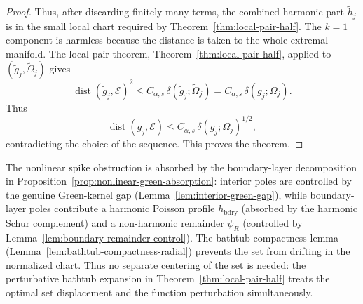 \begin{proof}
Thus, after discarding finitely many terms, the combined harmonic part
$\widetilde h_j$ is in the small local chart required by
Theorem~\ref{thm:local-pair-half}.  The $k=1$ component is harmless because
the distance is taken to the whole extremal manifold.  The local pair theorem,
Theorem~\ref{thm:local-pair-half}, applied to
$(\widetilde g_j,\widetilde\Omega_j)$ gives
\[
\operatorname{dist}(\widetilde g_j,\mathcal E)^2
\le
C_{\alpha,s}\,\delta(\widetilde g_j;\widetilde\Omega_j)
=
C_{\alpha,s}\,\delta(g_j;\Omega_j).
\]
Thus
\[
\operatorname{dist}(g_j,\mathcal E)
\le
C_{\alpha,s}\,\delta(g_j;\Omega_j)^{1/2},
\]
contradicting the choice of the sequence. This proves the theorem.
\end{proof}

\begin{numrem}
The nonlinear spike obstruction is absorbed by the boundary-layer
decomposition in Proposition~\ref{prop:nonlinear-green-absorption}:
interior poles are controlled by the genuine Green-kernel gap
(Lemma~\ref{lem:interior-green-gap}), while boundary-layer poles contribute
a harmonic Poisson profile $h_{\mathrm{bdry}}$ (absorbed by the harmonic
Schur complement) and a non-harmonic remainder $\psi_R$ (controlled by
Lemma~\ref{lem:boundary-remainder-control}).  The bathtub compactness lemma
(Lemma~\ref{lem:bathtub-compactness-radial}) prevents the set from drifting
in the normalized chart.  Thus no separate centering of the set is needed:
the perturbative bathtub expansion in Theorem~\ref{thm:local-pair-half}
treats the optimal set displacement and the function perturbation
simultaneously.
\end{numrem}
